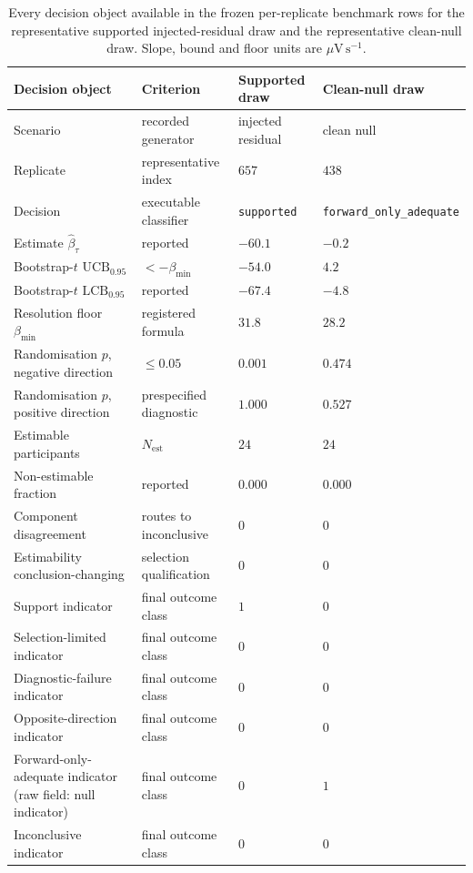 \begin{table}[H]
\centering
\caption{Every decision object available in the frozen per-replicate benchmark rows for the representative supported injected-residual draw and the representative clean-null draw. Slope, bound and floor units are \(\mu\mathrm{V\,s^{-1}}\).}
\label{tab:si-worked-decision}
\footnotesize
\setlength{\tabcolsep}{3pt}
\begin{tabularx}{\textwidth}{@{}
    >{\raggedright\arraybackslash}p{4.0cm}
    >{\raggedright\arraybackslash}X
    >{\raggedright\arraybackslash}p{3.0cm}
    >{\raggedright\arraybackslash}p{3.0cm}
@{}}
\toprule
Decision object & Criterion & Supported draw & Clean-null draw \\
\midrule
Scenario & recorded generator & injected residual & clean null \\
Replicate & representative index & \(657\) & \(438\) \\
Decision & executable classifier & \texttt{supported} &
\texttt{forward\_\allowbreak only\_\allowbreak adequate} \\
Estimate \(\widehat\beta_\tau\) & reported & \(-60.1\) & \(-0.2\) \\
Bootstrap-\(t\) \(\mathrm{UCB}_{0.95}\) & \(<-\beta_{\min}\) & \(-54.0\) & \(4.2\) \\
Bootstrap-\(t\) \(\mathrm{LCB}_{0.95}\) & reported & \(-67.4\) & \(-4.8\) \\
Resolution floor \(\beta_{\min}\) & registered formula & \(31.8\) & \(28.2\) \\
Randomisation \(p\), negative direction & \(\le 0.05\) & \(0.001\) & \(0.474\) \\
Randomisation \(p\), positive direction & prespecified diagnostic & \(1.000\) & \(0.527\) \\
Estimable participants & \(N_{\mathrm{est}}\) & \(24\) & \(24\) \\
Non-estimable fraction & reported & \(0.000\) & \(0.000\) \\
Component disagreement & routes to inconclusive & \(0\) & \(0\) \\
Estimability conclusion-changing & selection qualification & \(0\) & \(0\) \\
Support indicator & final outcome class & \(1\) & \(0\) \\
Selection-limited indicator & final outcome class & \(0\) & \(0\) \\
Diagnostic-failure indicator & final outcome class & \(0\) & \(0\) \\
Opposite-direction indicator & final outcome class & \(0\) & \(0\) \\
Forward-only-adequate indicator (raw field: null indicator) & final outcome class & \(0\) & \(1\) \\
Inconclusive indicator & final outcome class & \(0\) & \(0\) \\
\bottomrule
\end{tabularx}
\end{table}
